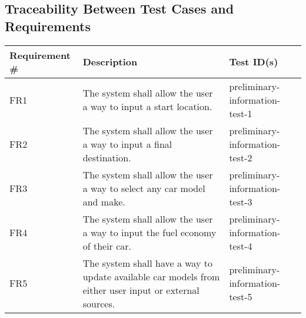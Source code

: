 \documentclass[12pt, titlepage]{article}
\begin{document}
\newpage

\subsection{Traceability Between Test Cases and Requirements}
  
  \begin{table}[!hbp]
	
	\begin{tabular}{|p{3.5cm}|p{6.5cm}|p{4.5cm}|}

	\hline
	\textbf{Requirement \#} & \textbf{Description}                                                                                                                                                                  & \textbf{Test ID(s)}                                                                                          \\ \hline
	FR1                     & The system shall allow the user a way to input a start location.                                                                                     & preliminary-information-test-1                                                                                                 \\ \hline
	FR2                     & The system shall allow the user a way to input a final destination.                                                                             & preliminary-information-test-2                                                                                               \\ \hline
	FR3                     & The system shall allow the user a way to select any car model and make.                                                                                                  & preliminary-information-test-3                                                                                         \\ \hline
	FR4                     & The system shall allow the user a way to input the fuel economy of their car.  & preliminary-information-test-4                                                                                         \\ \hline
	FR5                     & The system shall have a way to update available car models from either user input or external sources.                                                                                                         & preliminary-information-test-5                                                                                          \\ \hline

\end{tabular}
\end{table}
\end{document}
